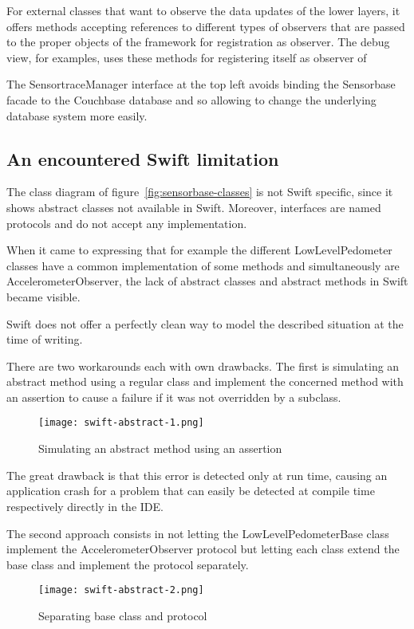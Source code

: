 For external classes that want to observe the data updates of the lower layers, it offers methods accepting references to different types of observers that are passed to the proper objects of the framework for registration as observer. The debug view, for examples, uses these methods for registering itself as observer of 

The SensortraceManager interface at the top left avoids binding the Sensorbase facade to the Couchbase database and so allowing to change the underlying database system more easily.


\subsection{An encountered Swift limitation}

The class diagram of figure~\ref{fig:sensorbase-classes} is not Swift specific, since it shows abstract classes not available in Swift. Moreover, interfaces are named protocols and do not accept any implementation.

When it came to expressing that for example the different LowLevelPedometer classes have a common implementation of some methods and simultaneously are AccelerometerObserver, the lack of abstract classes and abstract methods in Swift became visible. 

Swift does not offer a perfectly clean way to model the described situation at the time of writing. 

There are two workarounds each with own drawbacks. The first is simulating an abstract method using a regular class and implement the concerned method with an assertion to cause a failure if it was not overridden by a subclass. 

\begin{figure}[H]
\centering
\texttt{[image: swift-abstract-1.png]}
\caption{Simulating an abstract method using an assertion}
\end{figure}

The great drawback is that this error is detected only at run time, causing an application crash for a problem that can easily be detected at compile time respectively directly in the IDE.

The second approach consists in not letting the LowLevelPedometerBase class implement the AccelerometerObserver protocol but letting each class extend the base class and implement the protocol separately.

\begin{figure}[H]
\centering
\texttt{[image: swift-abstract-2.png]}
\caption{Separating base class and protocol}
\end{figure}

